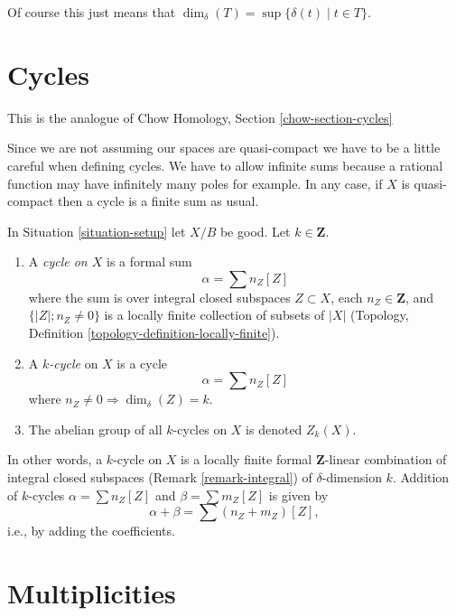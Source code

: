 \noindent
Of course this just means that
$\dim_\delta(T) = \sup \{\delta(t) \mid t \in T\}$.







\section{Cycles}
\label{section-cycles}

\noindent
This is the analogue of Chow Homology, Section \ref{chow-section-cycles}

\medskip\noindent
Since we are not assuming our spaces are quasi-compact we have
to be a little careful when defining cycles. We have to allow
infinite sums because a rational function may have infinitely many
poles for example. In any case, if $X$ is quasi-compact then a
cycle is a finite sum as usual.

\begin{definition}
\label{definition-cycles}
In Situation \ref{situation-setup} let $X/B$ be good.
Let $k \in \mathbf{Z}$.
\begin{enumerate}
\item A {\it cycle on $X$} is a formal sum
$$
\alpha = \sum n_Z [Z]
$$
where the sum is over integral closed subspaces $Z \subset X$,
each $n_Z \in \mathbf{Z}$, and
$\{|Z|; n_Z \not = 0\}$ is a locally finite
collection of subsets of $|X|$
(Topology, Definition \ref{topology-definition-locally-finite}).
\item A {\it $k$-cycle} on $X$ is
a cycle
$$
\alpha = \sum n_Z [Z]
$$
where $n_Z \not = 0 \Rightarrow \dim_\delta(Z) = k$.
\item The abelian group of all $k$-cycles on $X$ is denoted $Z_k(X)$.
\end{enumerate}
\end{definition}

\noindent
In other words, a $k$-cycle on $X$ is a locally finite formal
$\mathbf{Z}$-linear combination of integral closed subspaces
(Remark \ref{remark-integral}) of $\delta$-dimension $k$.
Addition of $k$-cycles $\alpha = \sum n_Z[Z]$ and
$\beta = \sum m_Z[Z]$ is given by
$$
\alpha + \beta = \sum (n_Z + m_Z)[Z],
$$
i.e., by adding the coefficients.




\section{Multiplicities}
\label{section-multiplicities}

